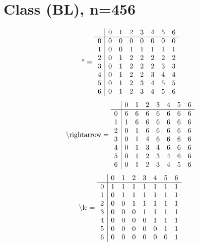 \documentclass[11pt]{article}
\begin{document}
\section{Class (BL), n=456}
\[\text{*} = 
\begin{array}{r | r r r r r r r}
 & 0 & 1 & 2 & 3 & 4 & 5 & 6 \\ \hline
0 & 0 & 0 & 0 & 0 & 0 & 0 & 0 \\
1 & 0 & 0 & 1 & 1 & 1 & 1 & 1 \\
2 & 0 & 1 & 2 & 2 & 2 & 2 & 2 \\
3 & 0 & 1 & 2 & 2 & 2 & 3 & 3 \\
4 & 0 & 1 & 2 & 2 & 3 & 4 & 4 \\
5 & 0 & 1 & 2 & 3 & 4 & 5 & 5 \\
6 & 0 & 1 & 2 & 3 & 4 & 5 & 6 \\
\end{array}
\]
\[\text{\textbackslash rightarrow} = 
\begin{array}{r | r r r r r r r}
 & 0 & 1 & 2 & 3 & 4 & 5 & 6 \\ \hline
0 & 6 & 6 & 6 & 6 & 6 & 6 & 6 \\
1 & 1 & 6 & 6 & 6 & 6 & 6 & 6 \\
2 & 0 & 1 & 6 & 6 & 6 & 6 & 6 \\
3 & 0 & 1 & 4 & 6 & 6 & 6 & 6 \\
4 & 0 & 1 & 3 & 4 & 6 & 6 & 6 \\
5 & 0 & 1 & 2 & 3 & 4 & 6 & 6 \\
6 & 0 & 1 & 2 & 3 & 4 & 5 & 6 \\
\end{array}
\]
\[\text{\textbackslash le} = 
\begin{array}{r | r r r r r r r}
 & 0 & 1 & 2 & 3 & 4 & 5 & 6 \\ \hline
0 & 1 & 1 & 1 & 1 & 1 & 1 & 1 \\
1 & 0 & 1 & 1 & 1 & 1 & 1 & 1 \\
2 & 0 & 0 & 1 & 1 & 1 & 1 & 1 \\
3 & 0 & 0 & 0 & 1 & 1 & 1 & 1 \\
4 & 0 & 0 & 0 & 0 & 1 & 1 & 1 \\
5 & 0 & 0 & 0 & 0 & 0 & 1 & 1 \\
6 & 0 & 0 & 0 & 0 & 0 & 0 & 1 \\
\end{array}
\]
\end{document}
